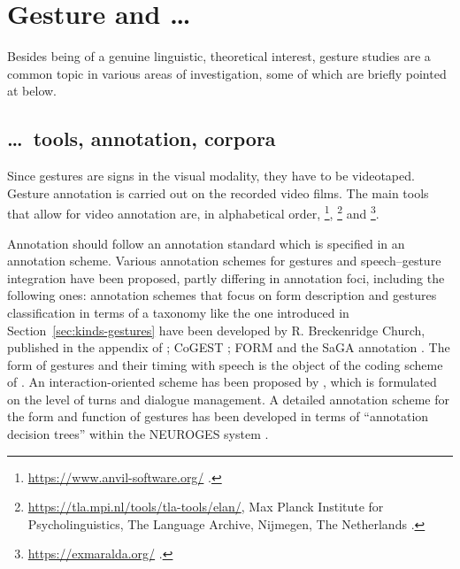 \documentclass[output=paper,biblatex,babelshorthands,newtxmath,draftmode,colorlinks,citecolor=brown]{langscibook}
\begin{document}
\section{Gesture and \ldots}
\label{sec:gesture-and}

\largerpage
Besides being of a genuine linguistic, theoretical interest, gesture studies are a common topic in
various areas of investigation, some of which are briefly pointed at below.


\subsection{\ldots\ tools, annotation, corpora}
\label{sec:tools-annotation-corpora}

Since gestures are signs in the visual modality, they have to be videotaped.
%
Gesture annotation is carried out on the recorded video films.
%
The main tools that allow for video annotation are, in alphabetical order, \footnote{%
\url{https://www.anvil-software.org/} \citep{Kipp:2014}.
}, \footnote{%
\url{https://tla.mpi.nl/tools/tla-tools/elan/}, Max Planck Institute for Psycholinguistics, The
Language Archive, Nijmegen, The Netherlands \citep{Sloetjes:Wittenburg:2008}.}
and \footnote{%
\url{https://exmaralda.org/} \citep{Schmidt:2012}.
}.

Annotation should follow an annotation standard which is specified in an annotation scheme.
%
Various annotation schemes for gestures and speech--gesture integration have been proposed, partly differing in annotation foci, including the following ones:
%
annotation schemes that focus on form description and gestures classification in terms of a taxonomy like the one introduced in Section~\ref{sec:kinds-gestures} have been developed by R. Breckenridge Church, published in the appendix of \citet{McNeill:1992}; CoGEST \citep{Gibbon:et:al:2003}; FORM \citep{Martell:Osborn:Friedman:Howard:2002} and the SaGA annotation \citep{Luecking:Bergmann:Hahn:Kopp:Rieser:2013}.
%
The form of gestures and their timing with speech is the object of the coding scheme of \citet{Kipp:Neff:Albrecht:2007}.
%
An interaction-oriented scheme has been proposed by \citet{Allwood:et:al:2007}, which is formulated on the level of turns and dialogue management.
%
A detailed annotation scheme for the form and function of gestures has been developed in terms of \enquote{annotation decision trees} within the NEUROGES system \citep{Lausberg:Sloetjes:2009}.
\end{document}

